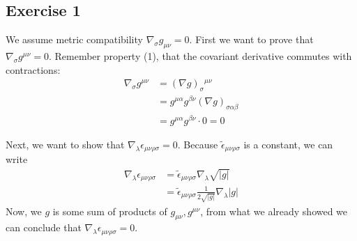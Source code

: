 \subsection{Exercise 1}
We assume metric compatibility  $\nabla_\sigma g_{\mu\nu}=0$. First we want to prove that $\nabla_\sigma g^{\mu\nu}=0$.
Remember property (1), that the covariant derivative commutes with contractions:
\begin{align}
    \nabla_\sigma g^{\mu\nu} &= (\nabla g)_{\sigma}{^{\mu\nu}} \\
    &= g^{\mu\alpha} g^{\beta\nu} (\nabla g)_{\sigma\alpha\beta} \\
    &= g^{\mu\alpha} g^{\beta\nu} \cdot 0 =0
\end{align}

Next, we want to show that $\nabla_\lambda \epsilon_{\mu\nu\rho\sigma}=0$. Because $\tilde{\epsilon}_{\mu\nu\rho\sigma}$ is a constant, we can write
\begin{align}
    \nabla_\lambda \epsilon_{\mu\nu\rho\sigma} &= \tilde{\epsilon}_{\mu\nu\rho\sigma}\nabla_\lambda \sqrt{|g|} \\
    &= \tilde{\epsilon}_{\mu\nu\rho\sigma} \frac{1}{2\sqrt{|g|}}\nabla_\lambda |g|
\end{align}
Now, we $g$ is some sum of products of $g_{\mu\nu},g^{\mu\nu}$, from what we already showed we can conclude that  $\nabla_\lambda \epsilon_{\mu\nu\rho\sigma}=0$.


